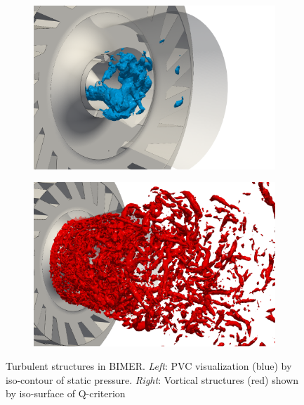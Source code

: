 \begin{figure}[ht]
\centering
\begin{subfigure}[b]{0.4\textwidth}
	\centering
   \includegraphics[scale=0.35]{./part3_applications/figures_ch7_aero/BIMER_application_PVC/PVC_P_m3000}
   \label{fig:BIMER_application_PVC}
\end{subfigure}
\hspace{0.8in}
\begin{subfigure}[b]{0.4\textwidth}
\centering
   \includegraphics[scale=0.35]{./part3_applications/figures_ch7_aero/BIMER_application_PVC/Q_crit_2e8}
   \label{fig:BIMER_application_Qcrit}
\end{subfigure}
\caption[Turbulent structures in BIMER]{Turbulent structures in BIMER. \textsl{Left}: PVC visualization (blue) by iso-contour of static pressure. \textsl{Right}: Vortical structures (red) shown by iso-surface of Q-criterion}
\label{fig:BIMER_application_turbulent_structures}
\end{figure}






